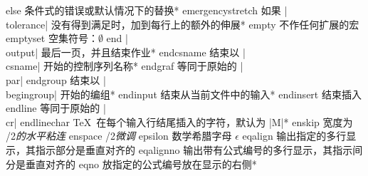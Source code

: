 \capcs else {条件式的错误或默认情况下的替换}*{\@else}
\capcs emergencystretch {如果 |\\tol\-er\-ance| 没有得到满足时，加到每行上的额外的伸展}*{}
\capcs empty {不作任何扩展的宏}{}{}
\capcs emptyset {空集符号：$\emptyset$}{}{}
\capcs end {|\\output| 最后一页，并且结束作业}*{}
\capcs endcsname {结束以 |\\csname| 开始的控制序列名称}*{}
\capcs endgraf {等同于原始的 |\\par|}{}{}
\capcs endgroup {结束以 |\\begingroup| 开始的编组}*{}
\capcs endinput {结束从当前文件中的输入}*{}
\capcs endinsert {结束插入}{}{}
\capcs endline {等同于原始的 |\\cr|}{}{}
\capcs endlinechar {\TeX\ 在每个输入行结尾插入的字符，默认为 |\twocarets M|}*{}
\capcs enskip {宽度为 /2\em 的水平粘连}{}{}
\capcs enspace {/2\em 微调}{}{}
\capcs epsilon {数学希腊字母 $\epsilon$}{}{}
\capcs eqalign {输出指定的多行显示，其指示部分是垂直对齐的}{}{}
\capcs eqalignno {输出带有公式编号的多行显示，其指示间分是垂直对齐的}{}{}
\capcs eqno {放指定的公式编号放在显示的右侧}*{}
